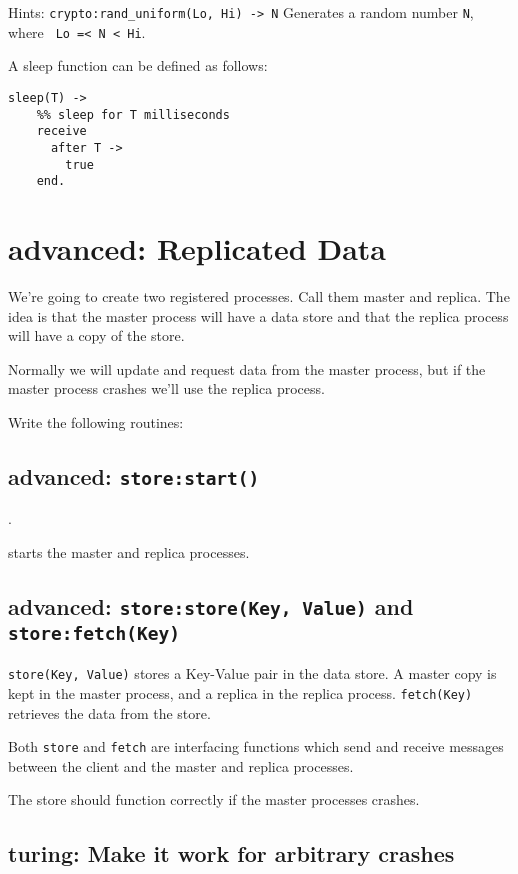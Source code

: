 \documentclass[12pt]{hitec}
\begin{document}
Hints: \verb+crypto:rand_uniform(Lo, Hi) -> N+
Generates a random number \verb+N+, where \verb+ Lo =< N < Hi+.

A sleep function can be defined as follows:

\begin{Verbatim}
sleep(T) ->
    %% sleep for T milliseconds
    receive
      after T ->
        true
    end.
\end{Verbatim}



\section{advanced: Replicated Data}

We're going to create two registered processes. Call them master and replica.
The idea is that the master process will have a data store and that
the replica process will have a copy of the store.

Normally we will update and request data from the master process, but
if the master process crashes we'll use the replica process.

Write the following routines:

\subsection{advanced: \texttt{store:start()}}.

starts the master and replica processes.

\subsection{advanced: \texttt{store:store(Key, Value)} and \texttt{store:fetch(Key)}}

\verb+store(Key, Value)+ stores a Key-Value pair in the data store.  A
master copy is kept in the master process, and a replica in the
replica process. \verb+fetch(Key)+ retrieves the data from the store.

Both \verb+store+ and \verb+fetch+ are interfacing functions which
send and receive messages between the client and the master and
replica processes.

The store should function correctly if the master processes crashes.

\subsection{turing: Make it work for arbitrary crashes}
\end{document}
